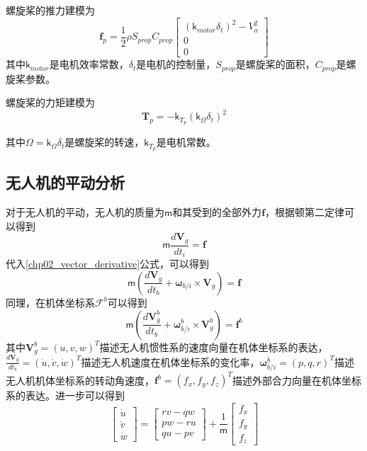 螺旋桨的推力建模为
\begin{equation}
	\mathbf{f}_p = \frac{1}{2} \rho S_{prop} C_{prop}  \begin{bmatrix} (\mathsf{k}_{motor} \delta_t)^2 - V_a^2  \\ 0  \\ 0  \end{bmatrix}
\end{equation}
其中$\mathsf{k}_{motor}$是电机效率常数，$\delta_t$是电机的控制量，$S_{prop}$是螺旋桨的面积，$C_{prop}$是螺旋桨参数。

螺旋桨的力矩建模为
\begin{equation}
	\mathbf{T}_p = -\mathsf{k}_{T_p} (\mathsf{k}_{\Omega} \delta_{t})^2
\end{equation}

其中$\Omega = \mathsf{k}_{\Omega} \delta_{t}$是螺旋桨的转速，$\mathsf{k}_{T_p}$是电机常数。

\subsection{无人机的平动分析}
对于无人机的平动，无人机的质量为$\mathsf{m}$和其受到的全部外力$\mathbf{f}$，根据顿第二定律可以得到
\begin{equation}
	\mathsf{m} \frac{d \mathbf{V}_g}{d t_i} = \mathbf{f}
\end{equation}
代入\ref{chp02_vector_derivative}公式，可以得到
\begin{equation}
	\mathsf{m}(\frac{d \mathbf{V}_g }{dt_b}+ \mathbf{\omega}_{b/i} \times \mathbf{V}_g)=\mathbf{f}
\end{equation}
同理，在机体坐标系$\mathcal{F}^b$可以得到
\begin{equation}
	\mathsf{m}(\frac{d \mathbf{V}^b_g }{dt_b}+ \mathbf{\omega}_{b/i}^b \times \mathbf{V}^b_g)=\mathbf{f}^b
\end{equation}
其中$\mathbf{V}_g^b=(u, v, w)^T$描述无人机惯性系的速度向量在机体坐标系的表达，$\frac{d \mathbf{V}_g }{dt_b}=(\dot{u}, \dot{v}, \dot{w})^T$描述无人机速度在机体坐标系的变化率，$\mathbf{\omega}_{b/i}^b=(p, q, r)^T$描述无人机机体坐标系的转动角速度，$\mathbf{f}^b = (f_x, f_y, f_z)^T$描述外部合力向量在机体坐标系的表达。进一步可以得到
\begin{equation}
	\begin{bmatrix} \dot{u} \\ \dot{v} \\ \dot{w}  \end{bmatrix} = \begin{bmatrix} rv-qw \\ pw-ru \\ qu-pv  \end{bmatrix} + \frac{1}{\mathsf{m}} \begin{bmatrix} f_x \\ f_y \\ f_z  \end{bmatrix}
\end{equation}



